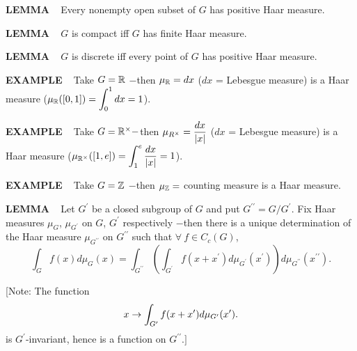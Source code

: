\vspace{0.1cm}

\begin{x}{\small\bf LEMMA} \ %
Every nonempty open subset of $G$ has positive Haar measure.
\end{x}

\vspace{0.1cm}

\begin{x}{\small\bf LEMMA} \ %
$G$ is compact iff $G$ has finite Haar measure.
\end{x}

\vspace{0.1cm}

\begin{x}{\small\bf LEMMA} \ %
$G$ is discrete iff every point of $G$ has positive Haar measure.
\end{x}

\vspace{0.1cm}

\begin{x}{\small\bf EXAMPLE}   \ %
Take $G = \mathbb{R}$ $-$then $\mu_{ \mathbb{R}} = dx$ ($dx$ = Lebesgue measure) is a Haar measure 
($\mu_{\mathbb{R}} ([0,1]) = \displaystyle\int_0^1dx = 1$).
\end{x}

\vspace{0.1cm}

\begin{x}{\small\bf EXAMPLE} \ %
Take $G = \mathbb{R}^\times -$then $\mu_{R^\times} = \displaystyle\frac{dx}{\left\vert x\right\vert}$ ($dx$ = Lebesgue measure) 
is a Haar measure ($\mu_{\mathbb{R}^\times} ([1,e]) = \displaystyle\int_1^e\frac{dx}{\left\vert x\right\vert} = 1$).
\end{x}


\begin{x}{\small\bf EXAMPLE} \ %
Take $G = \mathbb{Z}$ $-$then $\mu_{ \mathbb{Z}} =$ counting measure is a Haar measure.
\end{x}

\vspace{0.1cm}

\begin{x}{\small\bf LEMMA} \ %
Let $G^\prime$ be a closed subgroup of $G$ and put $G^{\prime \prime} = G/G^\prime$.  
Fix Haar measures $\mu_{G}$, $\mu_{G^{\prime}}$ on $G$, $G^\prime$ respectively 
$-$then there is a unique determination of the Haar measure 
$\mu_{G^{\prime \prime}}$ on $G^{\prime \prime}$ such that $\forall \ f \in C_c(G)$, 
\[
\int_Gf(x)d\mu_G(x) 
= \int_{G^{\prime \prime}} \left( \int_{G^\prime} f(x + x^\prime)d\mu_{G^\prime}(x^\prime)\right) 
d\mu_{G^{\prime \prime}} (x^{\prime \prime}).
\]

\vspace{0.1cm}

[Note: The function
\[
x \rightarrow \int_{G^\prime} f(x + x^\prime) d\mu_{G^\prime} (x^\prime).
\]
is $G^{\prime}$-invariant, hence is a function on $G^{\prime \prime}.]$
\end{x}

